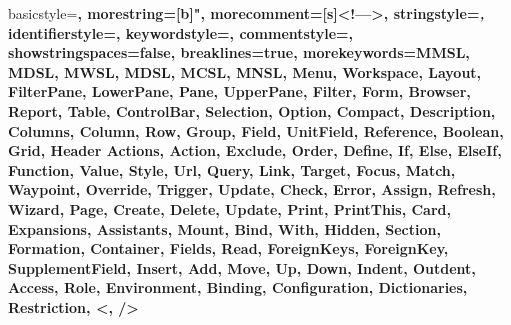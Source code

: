 {
  basicstyle=\footnotesize\ttfamily\color{xmlTag}\bfseries,
  morestring=[b]",
  morecomment=[s]{<!--}{-->},
  stringstyle=\color{xmlString}\textit,
  identifierstyle=\color{xmlAttr},
  keywordstyle=\color{xmlTag},
  commentstyle=\color{xmlComment},
  showstringspaces=false,
  breaklines=true,
  morekeywords={MMSL, MDSL, MWSL, MDSL, MCSL, MNSL,
  			    Menu, Workspace, Layout, 
  			    FilterPane, LowerPane, Pane, UpperPane, 
  			    Filter, Form, Browser, Report, Table,
  			    ControlBar, Selection, Option, Compact, Description, Columns,
  			    Column, Row, Group, Field, UnitField, Reference, Boolean, Grid, Header
  			    Actions, Action, Exclude, Order,
  			    Define, If, Else, ElseIf, Function, Value, Style,
  			    Url, Query, Link, Target, Focus, Match, Waypoint, Override, 
  			    Trigger, Update, Check, Error, Assign, Refresh,
  			    Wizard, Page,
  			    Create, Delete, Update, Print, PrintThis,
  			    Card, Expansions, Assistants, Mount, Bind, With, Hidden, Section, Formation, 
  			    Container, Fields, Read, ForeignKeys, ForeignKey, SupplementField,
  			    Insert, Add, Move, Up, Down, Indent, Outdent,
  			    Access, Role, Environment, Binding, Configuration, Dictionaries, Restriction, <, />}
}
